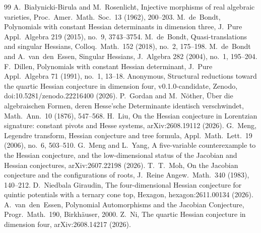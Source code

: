 \documentclass[11pt]{article}
\theoremstyle{remark}
\begin{document}
\begin{thebibliography}{99}
 A.~Bia\l{}ynicki-Birula and M.~Rosenlicht, Injective morphisms of real algebraic varieties, Proc.\ Amer.\ Math.\ Soc.\ 13 (1962), 200--203.
 M.~de~Bondt, Polynomials with constant Hessian determinants in dimension three, J.~Pure Appl.\ Algebra 219 (2015), no.~9, 3743--3754.
 M.~de~Bondt, Quasi-translations and singular Hessians, Colloq.\ Math.\ 152 (2018), no.~2, 175--198.
 M.~de~Bondt and A.~van~den~Essen, Singular Hessians, J.~Algebra 282 (2004), no.~1, 195--204.
 F.~Dillen, Polynomials with constant Hessian determinant, J.~Pure Appl.\ Algebra 71 (1991), no.~1, 13--18.
 Anonymous, Structural reductions toward the quartic Hessian conjecture in dimension four, v0.1.0-candidate, Zenodo, doi:10.5281/zenodo.22216400 (2026).
 P.~Gordan and M.~N\"other, \"Uber die algebraischen Formen, deren Hesse'sche Determinante identisch verschwindet, Math.\ Ann.\ 10 (1876), 547--568.
 H.~Liu, On the Hessian conjecture in Lorentzian signature: constant pivots and Hesse systems, arXiv:2608.19112 (2026).
 G.~Meng, Legendre transform, Hessian conjecture and tree formula, Appl.\ Math.\ Lett.\ 19 (2006), no.~6, 503--510.
 G.~Meng and L.~Yang, A five-variable counterexample to the Hessian conjecture, and the low-dimensional status of the Jacobian and Hessian conjectures, arXiv:2607.22198 (2026).
 T.~T.~Moh, On the Jacobian conjecture and the configurations of roots, J.~Reine Angew.\ Math.\ 340 (1983), 140--212.
 D.~Niedbala Giraudin, The four-dimensional Hessian conjecture for quintic potentials with a ternary cone top, Hexagon, hexagon:2611.00134 (2026).
 A.~van~den~Essen, Polynomial Automorphisms and the Jacobian Conjecture, Progr.\ Math.\ 190, Birkh\"auser, 2000.
 Z.~Ni, The quartic Hessian conjecture in dimension four, arXiv:2608.14217 (2026).
\end{thebibliography}
\end{document}
